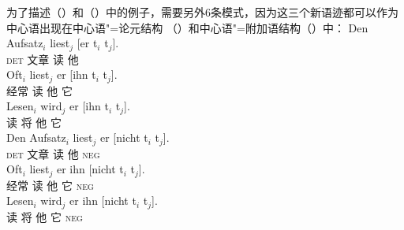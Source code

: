 为了描述（）和（）中的例子，需要另外6条模式，因为这三个新语迹都可以作为中心语出现在中心语"=论元结构 （）和中心语"=附加语结构（）中：
\eal
\ex 
\gll Den Aufsatz$_i$ liest$_j$ [er t$_i$ t$_j$].\\
	\textsc{det} 文章 读 \spacebr{}他\\
\ex 
\gll Oft$_i$ liest$_j$ er [ihn t$_i$ t$_j$].\\
	 经常 读 他 \spacebr{}它\\
\ex 
\gll Lesen$_i$ wird$_j$ er [ihn t$_i$ t$_j$].\\
	读 将 他 \spacebr{}它\\
\zl
\eal
\ex 
\gll Den Aufsatz$_i$ liest$_j$ er [nicht t$_i$ t$_j$].\\
	\textsc{det} 文章 读 他 \spacebr{}\textsc{neg}\\
\ex 
\gll Oft$_i$ liest$_j$ er ihn [nicht t$_i$ t$_j$].\\
	 经常 读 他 它 \spacebr{}\textsc{neg}\\
\ex 
\gll Lesen$_i$ wird$_j$ er ihn [nicht t$_i$ t$_j$].\\
	 读 将 他 它 \spacebr{}\textsc{neg}\\
